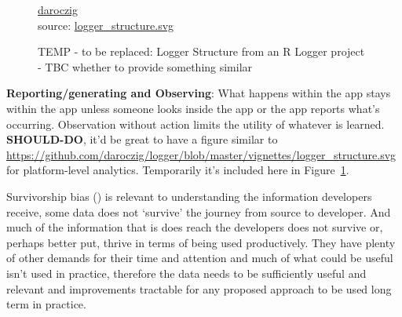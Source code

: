 \begin{figure}
\centering
    \copyrightbox[r]{
        \escapeus{}}
    {\textcopyright \href{{https://twitter.com/daroczig}}{daroczig}\\source: \href{https://github.com/daroczig/logger/blob/master/vignettes/logger\_structure.svg}{logger\_structure.svg}}
    \caption{TEMP - to be replaced: Logger Structure from an R Logger project - TBC whether to provide something similar}
    \label{fig:temp_logger_structure}
\end{figure}

\textbf{Reporting/generating and Observing}: What happens within the app stays within the app unless someone looks inside the app or the app reports what's occurring. Observation without action limits the utility of whatever is learned.  \textbf{SHOULD-DO}, it'd be great to have a figure similar to \url{https://github.com/daroczig/logger/blob/master/vignettes/logger_structure.svg} for platform-level analytics. Temporarily it's included here in Figure~\ref{fig:temp_logger_structure}.


Survivorship bias (\cite{wikipedia_survivorship_bias}) is relevant to understanding the information developers receive, some data does not `survive' the journey from source to developer. And much of the information that is does reach the developers does not survive or, perhaps better put, thrive in terms of being used productively. They have plenty of other demands for their time and attention and much of what could be useful isn't used in practice, therefore the data needs to be sufficiently useful and relevant and improvements tractable for any proposed approach to be used long term in practice.


